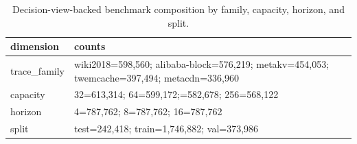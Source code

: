 \begin{table}[H]
  \centering
  \footnotesize
  \caption{Decision-view-backed benchmark composition by family, capacity, horizon, and split.}
  \label{tab:decision-breakdown}
  \begin{tabularx}{\columnwidth}{@{}P{0.22\columnwidth}L@{}}
    \toprule
    dimension & counts \\
    \midrule
    trace\_family & wiki2018=598,560; alibaba-block=576,219;\newline
    metakv=454,053; twemcache=397,494;\newline
    metacdn=336,960 \\
    capacity & 32=613,314; 64=599,172;=582,678; 256=568,122 \\
    horizon & 4=787,762; 8=787,762; 16=787,762 \\
    split & test=242,418; train=1,746,882; val=373,986 \\
    \bottomrule
  \end{tabularx}
\end{table}
